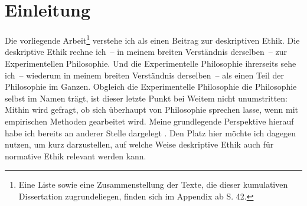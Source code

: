 \documentclass[justified,nobib,symmetric,twoside]{tufte-handout}
\begin{document}
\begin{abstract}
   \noindent In dieser Dissertation wird mittels einer Reihe von Vignettenstudien untersucht, welche Rolle Bedürfnisse im Umgang mit Problemen der Verteilungsgerechtigkeit spielen.
   Sie enthält dabei, unter anderem, sieben Hauptergebnisse:
   (1) In der Rolle von unparteiischen Beobachter*innen nehmen Versuchsteilnehmer*innen graduelle Gerechtigkeitseinschätzungen von Verteilungssituationen vor.
   (2) Diese Einschätzungen sind abhängig davon, wie umfangreich die beobachteten Parteien mit einem Gut ausgestattet sind.
   (3) Wenn außerdem bekannt ist, wie hoch deren Bedarf an jenem Gut ist, finden die Einschätzungen relativ zu diesem Referenzpunkt statt.
   (4) In der Rolle von unparteiischen Entscheider*innen treffen Versuchsteilnehmer*innen hypothetische Verteilungsentscheidungen, die den Bedarf, die Leistung sowie die Verantwortung der betroffenen Parteien berücksichtigen.
   (5) Hierbei wird der Bedarf einer Partei auch dann zumindest teilweise kompensiert, wenn diese weniger zu der zur Verfügung stehenden Gütermenge beigetragen hat, als sie selbst benötigt.
   (6) Die Bereitschaft, den Bedarf einer Partei teilweise zu kompensieren, sinkt jedoch, wenn sie dafür verantwortlich ist, mehr als andere zu benötigen oder weniger als andere beigetragen zu haben.
   (7) Sowohl in der Rolle von unparteiischen Beobachter*innen als auch in der Rolle von unparteiischen Entscheider*innen unterscheiden Versuchsteilnehmer*innen zwischen unterschiedlichen Bedarfsarten, deren Erfüllung sie verschiedene Wichtigkeit beimessen.
\end{abstract}


\vspace{1em}
\tableofcontents
\clearpage


\section{Einleitung}\label{sec:einleitung}
Die vorliegende Arbeit\footnote{Eine Liste sowie eine Zusammenstellung der Texte, die dieser kumulativen Dissertation zugrundeliegen, finden sich im Appendix ab S. 42.} verstehe ich als einen Beitrag zur deskriptiven Ethik.
Die deskriptive Ethik rechne ich~-- in meinem breiten Verständnis derselben~-- zur Experimentellen Philosophie.
Und die Experimentelle Philosophie ihrerseits sehe ich~-- wiederum in meinem breiten Verständnis derselben~-- als einen Teil der Philosophie im Ganzen.
Obgleich die Experimentelle Philosophie die Philosophie selbst im Namen trägt, ist dieser letzte Punkt bei Weitem nicht unumstritten: Mithin wird gefragt, ob sich überhaupt von Philosophie sprechen lasse, wenn mit empirischen Methoden gearbeitet wird.
Meine grundlegende Perspektive hierauf habe ich bereits an anderer Stelle dargelegt \citep{bauer_was_2020_a,bauer_was_2020_b}.
Den Platz hier möchte ich dagegen nutzen, um kurz darzustellen, auf welche Weise deskriptive Ethik auch für normative Ethik relevant werden kann.
\end{document}
